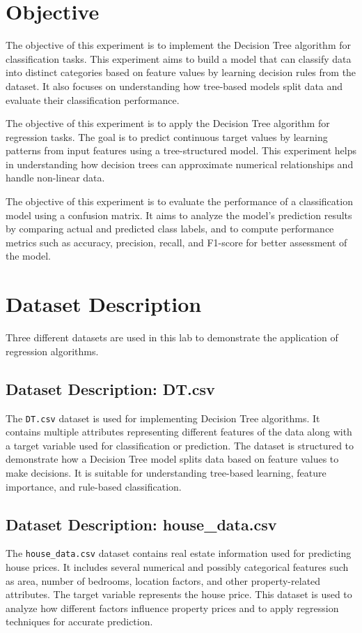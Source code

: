 \documentclass[11pt]{article}
\begin{document}
    
\tableofcontents
\thispagestyle{empty}
\clearpage
{}
    
	
\section{Objective}

The objective of this experiment is to implement the Decision Tree algorithm for classification tasks. This experiment aims to build a model that can classify data into distinct categories based on feature values by learning decision rules from the dataset. It also focuses on understanding how tree-based models split data and evaluate their classification performance.

The objective of this experiment is to apply the Decision Tree algorithm for regression tasks. The goal is to predict continuous target values by learning patterns from input features using a tree-structured model. This experiment helps in understanding how decision trees can approximate numerical relationships and handle non-linear data.

The objective of this experiment is to evaluate the performance of a classification model using a confusion matrix. It aims to analyze the model's prediction results by comparing actual and predicted class labels, and to compute performance metrics such as accuracy, precision, recall, and F1-score for better assessment of the model.


\section{Dataset Description}

Three different datasets are used in this lab to demonstrate the application of regression algorithms.

\subsection*{Dataset Description: DT.csv}
The \texttt{DT.csv} dataset is used for implementing Decision Tree algorithms. It contains multiple attributes representing different features of the data along with a target variable used for classification or prediction. The dataset is structured to demonstrate how a Decision Tree model splits data based on feature values to make decisions. It is suitable for understanding tree-based learning, feature importance, and rule-based classification.

\subsection*{Dataset Description: house\_data.csv}
The \texttt{house\_data.csv} dataset contains real estate information used for predicting house prices. It includes several numerical and possibly categorical features such as area, number of bedrooms, location factors, and other property-related attributes. The target variable represents the house price. This dataset is used to analyze how different factors influence property prices and to apply regression techniques for accurate prediction.
\end{document}
